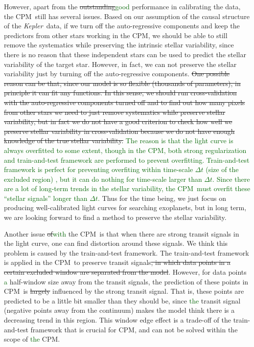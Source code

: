 \documentclass[12pt, preprint]{aastex}
\newcommand{\project}[1]{\textsl{#1}}
\newcommand{\Kepler}{\project{Kepler}}
\newcommand{\name}{CPM}
\newcommand{\revise}[1]{\textcolor{darkgreen}{#1}}
\newcommand{\remove}[1]{\sout{#1}}
\begin{document}
However, apart from the \remove{outstanding}\revise{good} performance in calibrating the data, the \name\ still has several issues. 
Based on our assumption of the causal structure of the \Kepler\ data, if we turn off the auto-regressive components and keep the predictors from other stars working in the \name, we should be able to still remove the systematics while preserving the intrinsic stellar variability, since there is no reason that these independent stars can be used to predict the stellar variability of the target star.
However, in fact, we can not preserve the stellar variability just by turning off the auto-regressive components. 
\remove{One possible reason can be that, since our model is so flexible (thousands of parameters), in principle it can fit any functions. 
In this sense, we should run cross-validation with the auto-regressive components turned off and to find out how many pixels from other stars we need to just remove systematics while preserve stellar variability, but in fact we do not have a good criterion to check how well we preserve stellar variability in cross-validation because we do not have enough knowledge of the true stellar variability.}
\revise{The reason is that the light curve is always overfitted to some extent, though in the \name, both strong regularization and train-and-test framework are performed to prevent overfitting. Train-and-test framework is perfect for preventing overfiting within time-scale $\Delta t$ (size of the excluded region) , but it can do nothing for time-scale larger than $\Delta t$. Since there are a lot of long-term trends in the stellar variability, the \name\ must overfit these ``stellar signals'' longer than $\Delta t$.} 
Thus for the time being, we just focus on producing well-calibrated light curves for searching exoplanets, but in long term, we are looking forward to find a method to preserve the stellar variability.

Another issue \remove{of}\revise{with} the \name\ is that when there are strong transit signals in the light curve, one can find distortion around these signals.
We think this problem is caused by the train-and-test framework.
The train-and-test framework is applied in the \name\ to preserve transit signals\remove{, in which data points in a certain excluded window are separated from the model}.
However, for data points \revise{a} half-window size away from the transit signals, the prediction of these points in \name\ is \remove{largely} influenced by the strong transit signal.
That is,  these points are predicted to be a little bit smaller than they should be, since \revise{the} transit signal (negative points away from the continuum) makes the model think there is a decreasing trend in this region.
This window edge effect is a trade-off of the train-and-test framework that is crucial for \name, and can not be solved within the scope of \revise{the} \name.
\end{document}
